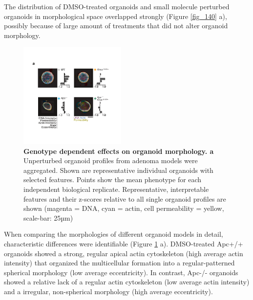 \begin{flushleft}
The distribution of DMSO-treated organoids and small molecule perturbed organoids in morphological space overlapped strongly (Figure \ref{fig_140} a), possibly because of large amount of treatments that did not alter organoid morphology.

\begin{figure}[h!]
\centering
\includegraphics[width=200,
                height=\textheight,
                keepaspectratio]{figures/adenomaprofiling/pdf/fig_1_3.pdf}
\caption{\textbf{Genotype dependent effects on organoid morphology. a} Unperturbed organoid profiles from adenoma models were aggregated. Shown are representative individual organoids with selected features. Points show the mean phenotype for each independent biological replicate. Representative, interpretable features and their z-scores relative to all single organoid profiles are shown (magenta = DNA, cyan = actin, cell permeability = yellow, scale-bar: 25µm)}
\label{fig_130}
\end{figure}
\bigbreak

When comparing the morphologies of different organoid models in detail, characteristic differences were identifiable (Figure \ref{fig_130} a). DMSO-treated Apc+/+ organoids showed a strong, regular apical actin cytoskeleton (high average actin intensity) that organized the multicellular formation into a regular-patterned spherical morphology (low average eccentricity). In contrast, Apc-/- organoids showed a relative lack of a regular actin cytoskeleton (low average actin intensity) and a irregular, non-spherical morphology (high average eccentricity). 


\end{flushleft}

